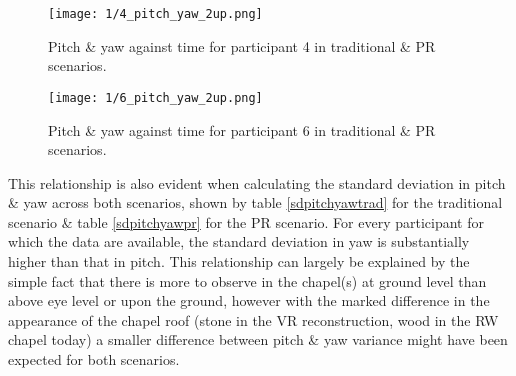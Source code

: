 \begin{figure}
	\begin{center}
	\texttt{[image: 1/4\_pitch\_yaw\_2up.png]}
	\caption{Pitch \& yaw against time for participant 4 in traditional \& PR scenarios.}
	\label{4_pitch_yaw_2up.png}
	\end{center}
\end{figure}

\begin{figure}
	\begin{center}
	\texttt{[image: 1/6\_pitch\_yaw\_2up.png]}
	\caption{Pitch \& yaw against time for participant 6 in traditional \& PR scenarios.}
	\label{6_pitch_yaw_2up.png}
	\end{center}
\end{figure}

This relationship is also evident when calculating the standard deviation in pitch \& yaw across both scenarios, shown by table \ref{sdpitchyawtrad} for the traditional scenario \& table \ref{sdpitchyawpr} for the PR scenario. For every participant for which the data are available, the standard deviation in yaw is substantially higher than that in pitch. This relationship can largely be explained by the simple fact that there is more to observe in the chapel(s) at ground level than above eye level or upon the ground, however with the marked difference in the appearance of the chapel roof (stone in the VR reconstruction, wood in the RW chapel today) a smaller difference between pitch \& yaw variance might have been expected for both scenarios.

